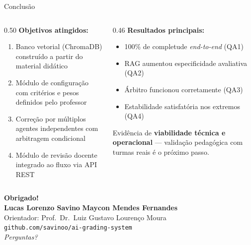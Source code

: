 \documentclass[10pt,aspectratio=169]{beamer}
\begin{document}
\begin{frame}{Conclusão}
  \begin{columns}[T]
    \begin{column}{0.50\textwidth}
      \textbf{Objetivos atingidos:}
      \begin{enumerate}
        \item[\checkmark] Banco vetorial (ChromaDB) construído a partir do material didático
        \item[\checkmark] Módulo de configuração com critérios e pesos definidos pelo professor
        \item[\checkmark] Correção por múltiplos agentes independentes com arbitragem condicional
        \item[\checkmark] Módulo de revisão docente integrado ao fluxo via API REST
      \end{enumerate}
    \end{column}
    \begin{column}{0.46\textwidth}
      \textbf{Resultados principais:}
      \begin{itemize}
        \item 100\% de completude \textit{end-to-end} (QA1)
        \item RAG aumentou especificidade avaliativa (QA2)
        \item Árbitro funcionou corretamente (QA3)
        \item Estabilidade satisfatória nos extremos (QA4)
      \end{itemize}
      \vspace{0.4em}
      \begin{alertblock}{}
        \small Evidência de \textbf{viabilidade técnica e operacional} — validação pedagógica com turmas reais é o próximo passo.
      \end{alertblock}
    \end{column}
  \end{columns}
\end{frame}

\begin{frame}[standout]
  \centering
  \Large \textbf{Obrigado!}\\[1em]
  \normalsize
  \textbf{Lucas Lorenzo Savino} \quad \textbf{Maycon Mendes Fernandes}\\[0.8em]
  Orientador: Prof.\ Dr.\ Luiz Gustavo Lourenço Moura\\[1em]
  \faGithub\quad \texttt{github.com/savinoo/ai-grading-system}\\[1em]
  \textit{Perguntas?}
\end{frame}
\end{document}
